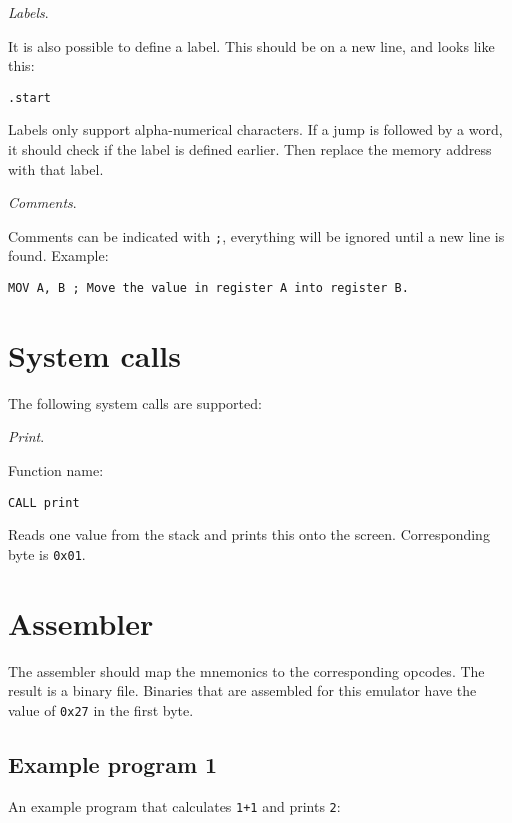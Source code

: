 \documentclass[11pt]{article}
\begin{document}
    \emph{Labels}.

It is also possible to define a label. This should be on a new line, and
looks like this:

\begin{verbatim}
.start
\end{verbatim}

Labels only support alpha-numerical characters. If a jump is followed by
a word, it should check if the label is defined earlier. Then replace
the memory address with that label.

\emph{Comments}.

Comments can be indicated with \texttt{;}, everything will be ignored
until a new line is found. Example:

\begin{verbatim}
MOV A, B ; Move the value in register A into register B.
\end{verbatim}

    \hypertarget{system-calls}{%
\section{System calls}\label{system-calls}}

    The following system calls are supported:

    \emph{Print}.

Function name:

\begin{verbatim}
CALL print
\end{verbatim}

Reads one value from the stack and prints this onto the screen.
Corresponding byte is \texttt{0x01}.

    \hypertarget{assembler}{%
\section{Assembler}\label{assembler}}

    The assembler should map the mnemonics to the corresponding opcodes. The
result is a binary file. Binaries that are assembled for this emulator
have the value of \texttt{0x27} in the first byte.

    \hypertarget{example-program-1}{%
\subsection{Example program 1}\label{example-program-1}}

    An example program that calculates \texttt{1+1} and prints \texttt{2}:
\end{document}
